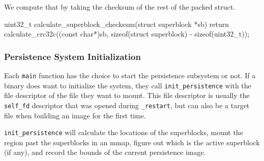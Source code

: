 We compute that by taking the checksum of the rest of the packed struct.

\begin{clang}
uint32_t calculate_superblock_checksum(struct superblock *sb) {
  return calculate_crc32c((const char*)sb,
                          sizeof(struct superblock) - sizeof(uint32_t));
}
\end{clang}

\subsubsection{Persistence System Initialization}

Each \lstinline|main| function has the choice to start the persistence
subsystem or not. If a binary does want to initialize the system, they
call \lstinline|init_persistence| with the file descriptor of the file they
want to mount. This file descriptor is usually the \lstinline|self_fd|
descriptor that was opened during \lstinline|_restart|, but can also be a
target file when building an image for the first time.

\lstinline|init_persistence| will calculate the locations of the superblocks,
mount the region past the superblocks in an mmap, figure out which is the
active superblock (if any), and record the bounds of the current persistence
image.

